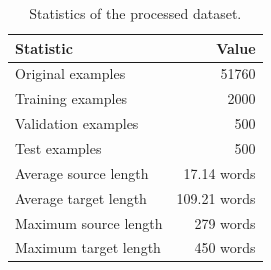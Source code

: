 \begin{table}[H]
    \centering
    \begin{tabular}{lr}
        \toprule
        \textbf{Statistic} & \textbf{Value} \\
        \midrule
        Original examples & 51760 \\
        Training examples & 2000 \\
        Validation examples & 500 \\
        Test examples & 500 \\
        Average source length & 17.14 words \\
        Average target length & 109.21 words \\
        Maximum source length & 279 words \\
        Maximum target length & 450 words \\
        \bottomrule
    \end{tabular}
    \caption{Statistics of the processed dataset.}
    \label{tab:data_stats}
\end{table}

